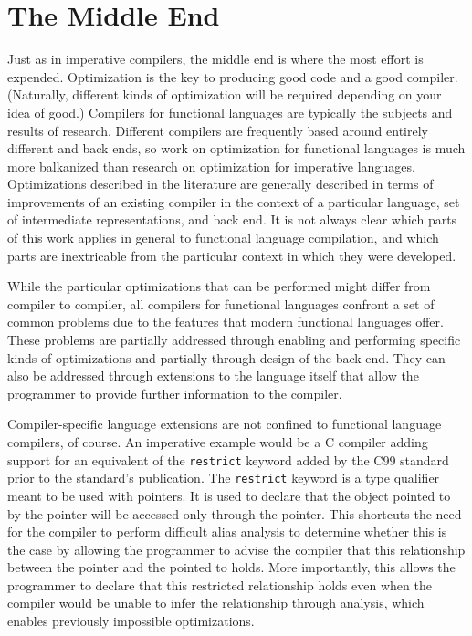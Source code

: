 \section{The Middle End}
Just as in imperative compilers, the middle end is where the most effort is expended. Optimization is the key to producing good code and a good compiler. (Naturally, different kinds of optimization will be required depending on your idea of good.) Compilers for functional languages are typically the subjects and results of research. Different compilers are frequently based around entirely different \IRs and back ends, so work on optimization for functional languages is much more balkanized than research on optimization for imperative languages. Optimizations described in the literature are generally described in terms of improvements of an existing compiler in the context of a particular language, set of intermediate representations, and back end. It is not always clear which parts of this work applies in general to functional language compilation, and which parts are inextricable from the particular context in which they were developed.

While the particular optimizations that can be performed might differ from compiler to compiler, all compilers for functional languages confront a set of common problems due to the features that modern functional languages offer. These problems are partially addressed through enabling and performing specific kinds of optimizations and partially through design of the back end. They can also be addressed through extensions to the language itself that allow the programmer to provide further information to the compiler.

Compiler-specific language extensions are not confined to functional language compilers, of course. An imperative example would be a C compiler adding support for an equivalent of the \lstinline[morekeywords=restrict]{restrict} keyword added by the C99 standard prior to the standard's publication. The \lstinline[morekeywords=restrict]{restrict} keyword is a type qualifier meant to be used with pointers. It is used to declare that the object pointed to by the pointer will be accessed only through the pointer. This shortcuts the need for the compiler to perform difficult alias analysis to determine whether this is the case by allowing the programmer to advise the compiler that this relationship between the pointer and the pointed to holds. More importantly, this allows the programmer to declare that this restricted relationship holds even when the compiler would be unable to infer the relationship through analysis, which enables previously impossible optimizations.

